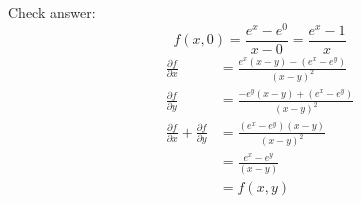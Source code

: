 \documentclass{article}
\begin{document}
Check answer:
\[f(x, 0) = \frac{e^x-e^0}{x-0} = \frac{e^x-1}{x}\]
\begin{align*}
  \frac{\partial f}{\partial x} &= \frac{e^x(x-y)-(e^x-e^y)}{(x-y)^2} \\
  \frac{\partial f}{\partial y} &= \frac{-e^y(x-y)+(e^x-e^y)}{(x-y)^2} \\
  \frac{\partial f}{\partial x}+\frac{\partial f}{\partial y} &= \frac{(e^x-e^y)(x-y)}{(x-y)^2} \\
  &= \frac{e^x-e^y}{(x-y)} \\
  &= f(x, y)
\end{align*}
\end{document}
